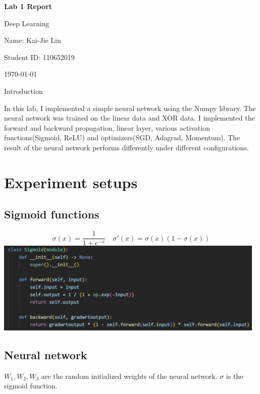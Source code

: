 \documentclass{article} %
\newcommand{\question}[2][]{\begin{flushleft}\textbf{Question #1}: \textit{#2}\end{flushleft}}
\newcommand{\maketitletwo}[2][]{\begin{center}
        \Large{\textbf{Lab 1 Report}
        
            Deep Learning} %
        \vspace{5pt}
        
        \normalsize{
            Name: Kai-Jie Lin 
            
            Student ID: 110652019
            
            \today}
        \vspace{15pt}
        \end{center}}
\begin{document}
    \maketitletwo[5]  %
    
    \section{Introduction}

    In this lab, I implemented a simple neural network using the Numpy library.
    The neural network was trained on the linear data and XOR data.
    I implemented the forward and backward propagation, linear layer, various activation functions(Sigmoid, ReLU) and optimizers(SGD, Adagrad, Momentum).
    The result of the neural network performs differently under different configurations.
    
    \section{Experiment setups}
    
    \subsection{Sigmoid functions}
    
    $$
    \sigma(x) = \frac{1}{1+e^{-x}} \quad
    \sigma'(x) = \sigma(x)(1-\sigma(x))
    $$\includegraphics[width=13cm]{./imgs/sigmoid.png}

    \subsection{Neural network}

    $W_1, W_2, W_3$ are the random initialized weights of the neural network. $\sigma$ is the sigmoid function.
    
\end{document}
